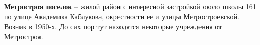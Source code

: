 \medskip

\textbf{Метростроя поселок} – жилой район с интересной застройкой около школы 161 по улице Академика Каблукова, окрестности ее и улицы Метростроевской. Возник в 1950-х. До сих пор тут находятся некоторые учреждения от Метростроя.\\

\medskip












